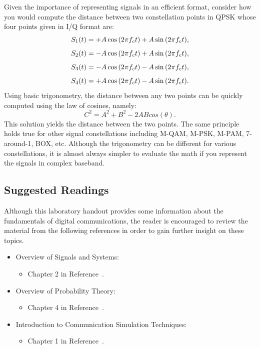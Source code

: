 \documentclass[letterpaper,12pt]{article}
\begin{document}
\noindent
Given the importance of representing signals in an efficient format, consider how you would compute the distance between two constellation points in QPSK whose four
points given in I/Q format are:
\begin{displaymath}
\centering
S_{1}(t) = +A\cos{(2{\pi}f_{c}t)}+A\sin{(2{\pi}f_{c}t)},
\end{displaymath}
\begin{displaymath}
\centering
S_{2}(t) = -A\cos{(2{\pi}f_{c}t)}+A\sin{(2{\pi}f_{c}t)},
\end{displaymath}
\begin{displaymath}
\centering
S_{3}(t) = -A\cos{(2{\pi}f_{c}t)}-A\sin{(2{\pi}f_{c}t)},
\end{displaymath}
\begin{displaymath}
\centering
S_{4}(t) = +A\cos{(2{\pi}f_{c}t)}-A\sin{(2{\pi}f_{c}t)}.
\end{displaymath}
Using basic trigonometry, the distance between any two points can be quickly computed using the law of cosines, namely:
\begin{equation}
C^2 = A^2 + B^2 - 2ABcos(\theta).
\label{eq:lawcosines}
\end{equation}
This solution yields the distance between the two points.  The same principle holds true for other signal constellations including M-QAM, M-PSK, M-PAM,
7-around-1, BOX, etc.  Although the trigonometry can be different for various constellations, it is almost always simpler to evaluate the math if you represent the signals in complex baseband.

\subsection{Suggested Readings}
Although this laboratory handout provides some information about the fundamentals of digital communications, the reader is encouraged to review the material from the
following references in order to gain further insight on these topics.
\begin{itemize}
 \item Overview of Signals and Systems:
\begin{itemize}
 \item Chapter 2 in Reference~\cite{rice2009}.
\end{itemize}
 \item Overview of Probability Theory:
\begin{itemize}
 \item Chapter 4 in Reference~\cite{rice2009}.
\end{itemize}
 \item Introduction to Communication Simulation Techniques:
\begin{itemize}
 \item Chapter 1 in Reference~\cite{silage2009}.
\end{itemize}
\end{itemize}
\end{document}

